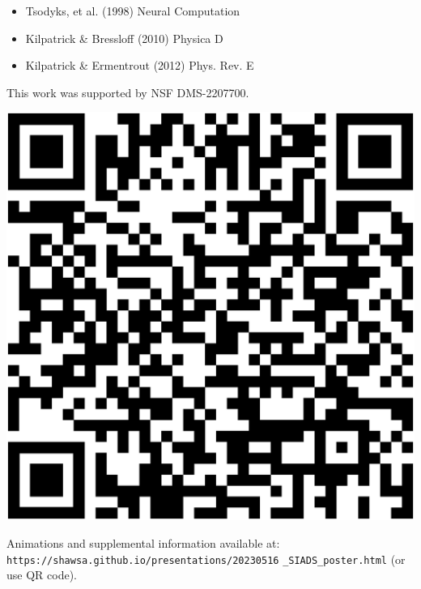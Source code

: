 \documentclass[landscape,final]{baposter}
\begin{document}
\begin{poster}
{
\begin{minipage}{.7\textwidth}
	\begin{itemize}
		\item Tsodyks, et al. (1998) Neural Computation
		\item Kilpatrick \& Bressloff (2010) Physica D 
		\item Kilpatrick \& Ermentrout (2012) Phys. Rev. E
	\end{itemize}
This work was supported by NSF DMS-2207700.
\end{minipage}
\begin{minipage}{.25\textwidth}
\includegraphics[width=\linewidth, trim={.7cm, .7cm, .7cm, .7cm}, clip=true]{QR}
\end{minipage}
\bigbreak

Animations and supplemental information available at:
\texttt{https://shawsa.github.io/presentations/20230516} \texttt{\_SIADS\_poster.html} (or use QR code).
}

\end{poster}
\end{document}
